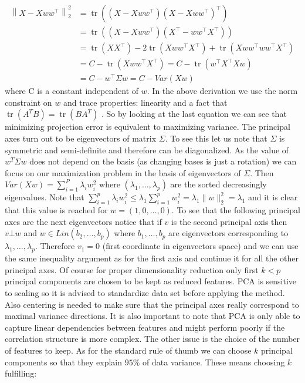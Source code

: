 \documentclass[12pt, wide]{mwart}
\begin{document}
\begin{align*}
\left\|X-X w w^{\top}\right\|^{2}_2 &=\operatorname{tr}\left(\left(X-X w w^{\top}\right)\left(X-X w w^{\top}\right)^{\top}\right) \\ &=\operatorname{tr}\left(\left(X-X w w^{\top}\right)\left(X^{\top}-w w^{\top} X^{\top}\right)\right) \\ &=\operatorname{tr}\left(X X^{\top}\right)-2 \operatorname{tr}\left(X w w^{\top} X^{\top}\right)+\operatorname{tr}\left(X w w^{\top} w w^{\top} X^{\top}\right) \\ &=C-\operatorname{tr}\left(X w w^{\top} X^{\top}\right)=C-\operatorname{tr}\left(w^{\top} X^{\top} X w\right) \\ &=C-w^{\top} \Sigma w = C - Var(Xw)
\end{align*} where C is a constant independent of $w$. In the above derivation we use the norm constraint on $w$ and trace properties: linearity and a fact that $\operatorname{tr}\left(A^TB\right) = \operatorname{tr}\left(BA^T\right)$ . So by looking at the last equation we can see that minimizing projection error is equivalent to maximizing variance. The principal axes turn out to be eigenvectors of matrix $\Sigma$. To see this let us note that $\Sigma$ is symmetric and semi-definite and therefore can be diagonalized. As the value of $w^T\Sigma w$ does not depend on the basis (as changing bases is just a rotation) we can focus on our maximization problem in the basis of eigenvectors of $\Sigma$. Then $Var(Xw) = \sum_{i=1}^P \lambda_i w_i^2$ where $(\lambda_1, \ldots, \lambda_p)$ are the sorted decreasingly eigenvalues. Note that $\sum_{i=1}^p \lambda_i w_i^2 \leq \lambda_1 \sum_{i=1}^p w_i^2 = \lambda_1 \| w\|_2^2 = \lambda_1$ and it is clear that this value is reached for $w = (1, 0, \ldots, 0)$. To see that the following principal axes are the next eigenvectors notice that if $v$ is the second principal axis then $v \bot w$ and $w \in Lin(b_2, \ldots, b_p)$ where $b_1, \ldots, b_p$ are eigenvectors corresponding to $\lambda_1, \ldots, \lambda_p$. Therefore $v_1 = 0$ (first coordinate in eigenvectors space) and we can use the same inequality argument as for the first axis and continue it for all the other principal axes. Of course for proper dimensionality reduction only first $k < p$ principal components are chosen to be kept as reduced features. 
PCA is sensitive to scaling so it is advised to standardize data set before applying the method. Also centering is needed to make sure that the principal axes really correspond to maximal variance directions. It is also important to note that PCA is only able to capture linear dependencies between features and might perform poorly if the correlation structure is more complex. The other issue is the choice of the number of features to keep. As for the standard rule of thumb we can choose $k$ principal components so that they explain $95\%$ of data variance. These means choosing $k$ fulfilling:
\end{document}
